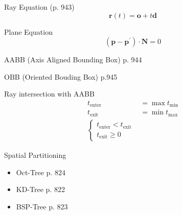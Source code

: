\documentclass[10pt,a4paper]{article}
\begin{document}
\begin{multicols}{3}
		Ray Equation (p. 943)
		\begin{equation*}
			\mathbf{r}(t) = \mathbf{o} + t\mathbf{d}
		\end{equation*}

		Plane Equation
		\begin{equation*}
			(\mathbf{p}-\mathbf{p^\prime})\cdot\mathbf{N}=0
		\end{equation*}

		AABB (Axis Aligned
		Bounding Box) p. 944

		OBB (Oriented Bouding Box) p.945

		Ray intersection with AABB
		\begin{align*}
			t_\text{enter} &= \max t_\text{min} \\
			t_\text{exit} &= \min t_\text{max} \\
			\begin{cases}
				t_\text{enter} < t_\text{exit} \\
				t_\text{exit} \geq 0
			\end{cases}
		\end{align*}

		Spatial Partitioning
		\begin{itemize}
			\item Oct-Tree p. 824
			\item KD-Tree p. 822
			\item BSP-Tree p. 823
		\end{itemize}

    \end{multicols}
\end{document}
